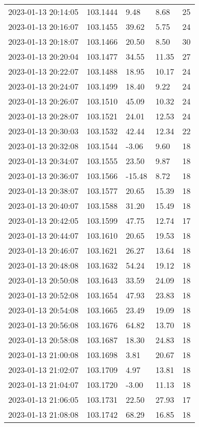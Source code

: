\documentclass{nature_plusfigure}
\begin{document}
\begin{supplement}
\begin{center}
\begin{longtable}{lllll}
2023-01-13 20:14:05 & 103.1444 & 9.48 & 8.68 & 25 \\ 
2023-01-13 20:16:07 & 103.1455 & 39.62 & 5.75 & 24 \\ 
2023-01-13 20:18:07 & 103.1466 & 20.50 & 8.50 & 30 \\ 
2023-01-13 20:20:04 & 103.1477 & 34.55 & 11.35 & 27 \\ 
2023-01-13 20:22:07 & 103.1488 & 18.95 & 10.17 & 24 \\ 
2023-01-13 20:24:07 & 103.1499 & 18.40 & 9.22 & 24 \\ 
2023-01-13 20:26:07 & 103.1510 & 45.09 & 10.32 & 24 \\ 
2023-01-13 20:28:07 & 103.1521 & 24.01 & 12.53 & 24 \\ 
2023-01-13 20:30:03 & 103.1532 & 42.44 & 12.34 & 22 \\ 
2023-01-13 20:32:08 & 103.1544 & -3.06 & 9.60 & 18 \\ 
2023-01-13 20:34:07 & 103.1555 & 23.50 & 9.87 & 18 \\ 
2023-01-13 20:36:07 & 103.1566 & -15.48 & 8.72 & 18 \\ 
2023-01-13 20:38:07 & 103.1577 & 20.65 & 15.39 & 18 \\ 
2023-01-13 20:40:07 & 103.1588 & 31.20 & 15.49 & 18 \\ 
2023-01-13 20:42:05 & 103.1599 & 47.75 & 12.74 & 17 \\ 
2023-01-13 20:44:07 & 103.1610 & 20.65 & 19.53 & 18 \\ 
2023-01-13 20:46:07 & 103.1621 & 26.27 & 13.64 & 18 \\ 
2023-01-13 20:48:08 & 103.1632 & 54.24 & 19.12 & 18 \\ 
2023-01-13 20:50:08 & 103.1643 & 33.59 & 24.09 & 18 \\ 
2023-01-13 20:52:08 & 103.1654 & 47.93 & 23.83 & 18 \\ 
2023-01-13 20:54:08 & 103.1665 & 23.49 & 19.09 & 18 \\ 
2023-01-13 20:56:08 & 103.1676 & 64.82 & 13.70 & 18 \\ 
2023-01-13 20:58:08 & 103.1687 & 18.30 & 24.83 & 18 \\ 
2023-01-13 21:00:08 & 103.1698 & 3.81 & 20.67 & 18 \\ 
2023-01-13 21:02:07 & 103.1709 & 4.97 & 13.81 & 18 \\ 
2023-01-13 21:04:07 & 103.1720 & -3.00 & 11.13 & 18 \\ 
2023-01-13 21:06:05 & 103.1731 & 22.50 & 27.93 & 17 \\ 
2023-01-13 21:08:08 & 103.1742 & 68.29 & 16.85 & 18 \\ 

\end{longtable}
\end{center}
\end{supplement}
\end{document}
